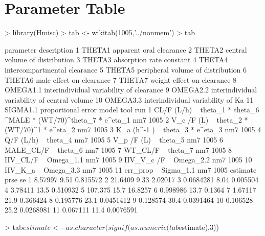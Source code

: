 \section{Parameter Table}
\begin{Schunk}
\begin{Sinput}
> library(Hmisc)
> tab <- wikitab(1005,'../nonmem')
> tab
\end{Sinput}
\begin{Soutput}
   parameter                                   description
1     THETA1                       apparent oral clearance
2     THETA2                central volume of distribution
3     THETA3                      absorption rate constant
4     THETA4                  intercompartmental clearance
5     THETA5             peripheral volume of distribution
6     THETA6                      male effect on clearance
7     THETA7                    weight effect on clearance
8   OMEGA1.1      interindividual variability of clearance
9   OMEGA2.2 interindividual variability of central volume
10  OMEGA3.3             interindividual variability of Ka
11  SIGMA1.1                            proportional error
                                                                model tool  run
1  CL/F (L/h) ~ theta_1 *  theta_6 ^MALE * (WT/70)^theta_7  * e^eta_1  nm7 1005
2                          V_c /F (L) ~ theta_2 * (WT/70)^1 * e^eta_2  nm7 1005
3                                     K_a (h^-1 ) ~ theta_3 * e^eta_3  nm7 1005
4                                                 Q/F (L/h) ~ theta_4  nm7 1005
5                                                V_p /F (L) ~ theta_5  nm7 1005
6                                                 MALE_CL/F ~ theta_6  nm7 1005
7                                                   WT_CL/F ~ theta_7  nm7 1005
8                                                IIV_CL/F ~ Omega_1.1  nm7 1005
9                                              IIV_V_c /F ~ Omega_2.2  nm7 1005
10                                               IIV_K_a  ~ Omega_3.3  nm7 1005
11                                               err_prop ~ Sigma_1.1  nm7 1005
    estimate prse        se
1    8.57997 9.51  0.815572
2    21.6409 9.33   2.02017
3  0.0684281 8.04  0.005504
4    3.78411 13.5  0.510932
5    107.375 15.7   16.8257
6   0.998986 13.7    0.1364
7    1.67117 21.9  0.366424
8   0.195776 23.1 0.0451412
9   0.128574 30.4 0.0391464
10  0.106528 25.2 0.0268981
11  0.067111 11.4 0.0076591
\end{Soutput}
\begin{Sinput}
> tab$estimate <- as.character(signif(as.numeric(tab$estimate),3))

\end{Sinput}
\end{Schunk}
